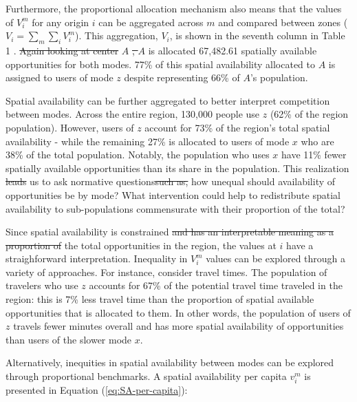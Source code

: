 \documentclass[10pt,letterpaper]{article}
\providecommand{\DIFaddtex}[1]{{\protect\color{blue}\uwave{#1}}} %
\providecommand{\DIFdeltex}[1]{{\protect\color{red}\sout{#1}}}                      %
\providecommand{\DIFaddbegin}{} %
\providecommand{\DIFaddend}{} %
\providecommand{\DIFdelbegin}{} %
\providecommand{\DIFdelend}{} %
\providecommand{\DIFadd}[1]{\texorpdfstring{\DIFaddtex{#1}}{#1}} %
\providecommand{\DIFdel}[1]{\texorpdfstring{\DIFdeltex{#1}}{}} %
\newcommand{\DIFscaledelfig}{0.5}
\newlength{\DIFdelgraphicswidth} %
\newlength{\DIFdelgraphicsheight} %
\newcommand{\DIFaddincludegraphics}[2][]{{\color{blue}\fbox{\DIFOincludegraphics[#1]{#2}}}} %
\newcommand{\DIFdelincludegraphics}[2][]{%
\sbox{\DIFdelgraphicsbox}{\DIFOincludegraphics[#1]{#2}}%
\settoboxwidth{\DIFdelgraphicswidth}{\DIFdelgraphicsbox} %
\settoboxtotalheight{\DIFdelgraphicsheight}{\DIFdelgraphicsbox} %
\scalebox{\DIFscaledelfig}{%
\parbox[b]{\DIFdelgraphicswidth}{\usebox{\DIFdelgraphicsbox}\\[-\baselineskip] \rule{\DIFdelgraphicswidth}{0em}}\llap{\resizebox{\DIFdelgraphicswidth}{\DIFdelgraphicsheight}{%
\setlength{\unitlength}{\DIFdelgraphicswidth}%
\begin{picture}(1,1)%
\thicklines\linethickness{2pt} %
{\color[rgb]{1,0,0}\put(0,0){\framebox(1,1){}}}%
{\color[rgb]{1,0,0}\put(0,0){\line( 1,1){1}}}%
{\color[rgb]{1,0,0}\put(0,1){\line(1,-1){1}}}%
\end{picture}%
}\hspace*{3pt}}} %
} %
\DeclareRobustCommand{\DIFaddbegin}{\DIFOaddbegin \let\includegraphics\DIFaddincludegraphics} %
\DeclareRobustCommand{\DIFaddend}{\DIFOaddend \let\includegraphics\DIFOincludegraphics} %
\DeclareRobustCommand{\DIFdelbegin}{\DIFOdelbegin \let\includegraphics\DIFdelincludegraphics} %
\DeclareRobustCommand{\DIFdelend}{\DIFOaddend \let\includegraphics\DIFOincludegraphics} %
\begin{document}
Furthermore, the proportional allocation mechanism also means that the
values of \(V_i^m\) for any origin \(i\) can be aggregated across \(m\)
and compared between zones (\(V_i = \sum_m{\sum_i{V_i^m}}\)). This
aggregation, \(V_i\), is shown in the seventh column in Table 1 . \DIFdelbegin \DIFdel{Again
looking at center }\DIFdelend \(A\)
\DIFdelbegin \DIFdel{, \(A\) }\DIFdelend is allocated 67,482.61 spatially available opportunities for both modes.
77\% of this spatial availability allocated to \(A\) is assigned to
users of mode \(z\) despite representing 66\% of \(A\)'s population.

Spatial availability can be further aggregated to better interpret
competition between modes. Across the entire region, 130,000 people use
\(z\) (62\% of the region population). However, users of \(z\) account
for 73\% of the region's total spatial availability - while the
remaining 27\% is allocated to users of mode \(x\) who are 38\% of the
total population. Notably, the population who uses \(x\) have 11\% fewer
spatially available opportunities than its share in the population. This
realization \DIFdelbegin \DIFdel{leads }\DIFdelend \DIFaddbegin \DIFadd{could lead }\DIFaddend us to ask normative questions\DIFdelbegin \DIFdel{such as, }\DIFdelend \DIFaddbegin \DIFadd{: }\DIFaddend how unequal should
availability of opportunities be by mode? What intervention could help
to redistribute spatial availability to sub-populations commensurate
with their proportion of the total?

Since spatial availability is constrained \DIFdelbegin \DIFdel{and has an interpretable
meaning as a proportion of }\DIFdelend \DIFaddbegin \DIFadd{to }\DIFaddend the total opportunities in
the region, the values at \(i\) have a straighforward interpretation.
Inequality in \(V_i^m\) values can be explored through a variety of
approaches. For instance, consider travel times. The population of
travelers who use \(z\) accounts for 67\% of the potential travel time
traveled in the region: this is 7\% less travel time than the proportion
of spatial available opportunities that is allocated to them. In other
words, the population of users of \(z\) travels fewer minutes overall
and has more spatial availability of opportunities than users of the
slower mode \(x\).

Alternatively, inequities in spatial availability between modes can be
explored through proportional benchmarks. A spatial availability per
capita \(v_i^m\) is presented in Equation (\ref{eq:SA-per-capita}):
\end{document}
